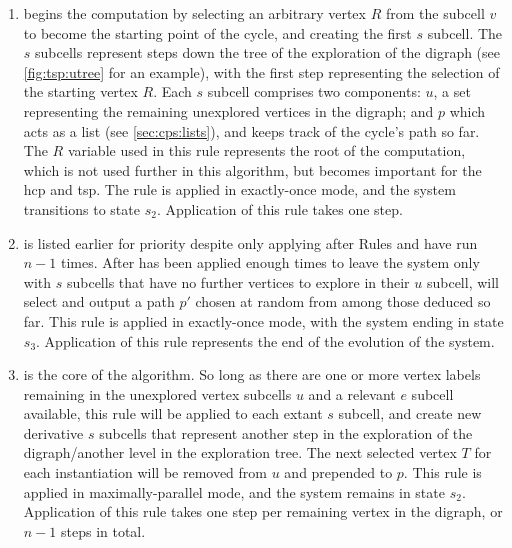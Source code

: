 \begin{enumerate}
    \item {} begins the computation by selecting an arbitrary vertex \(R\) from the subcell \(v\) to become the starting point of the cycle, and creating the first \(s\) subcell.  The \(s\) subcells represent steps down the tree of the exploration of the digraph (see \cref{fig:tsp:utree} for an example), with the first step representing the selection of the starting vertex \(R\).  Each \(s\) subcell comprises two components: \(u\), a set representing the remaining unexplored vertices in the digraph; and \(p\) which acts as a list (see \cref{sec:cps:lists}), and keeps track of the cycle's path so far.  The \(R\) variable used in this rule represents the root of the computation, which is not used further in this algorithm, but becomes important for the \gls{hcp} and \gls{tsp}.  The rule is applied in exactly-once mode, and the system transitions to state \(s_2\).  Application of this rule takes one step.
    \item {} is listed earlier for priority despite only applying after Rules  and  have run \(n - 1\) times.  After  has been applied enough times to leave the system only with \(s\) subcells that have no further vertices to explore in their \(u\) subcell,  will select and output a path \(p'\) chosen at random from among those deduced so far.  This rule is applied in exactly-once mode, with the system ending in state \(s_3\).  Application of this rule represents the end of the evolution of the system.
    \item {} is the core of the algorithm.  So long as there are one or more vertex labels remaining in the unexplored vertex subcells \(u\) and a relevant \(e\) subcell available, this rule will be applied to each extant \(s\) subcell, and create new derivative \(s\) subcells that represent another step in the exploration of the digraph/another level in the exploration tree.  The next selected vertex \(T\) for each instantiation will be removed from \(u\) and prepended to \(p\).  This rule is applied in maximally-parallel mode, and the system remains in state \(s_2\).  Application of this rule takes one step per remaining vertex in the digraph, or \(n - 1\) steps in total.

\end{enumerate}
